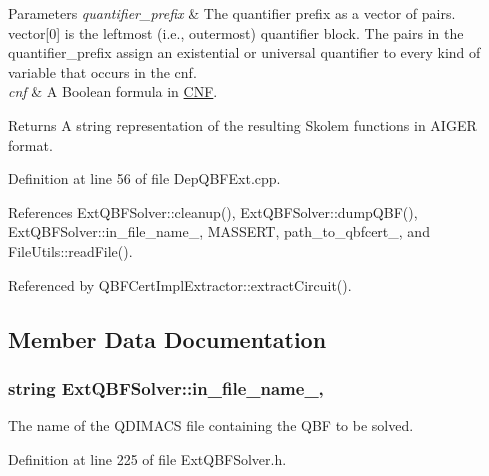 \begin{DoxyParams}{Parameters}
{\em quantifier\-\_\-prefix} & The quantifier prefix as a vector of pairs. vector\mbox{[}0\mbox{]} is the leftmost (i.\-e., outermost) quantifier block. The pairs in the quantifier\-\_\-prefix assign an existential or universal quantifier to every kind of variable that occurs in the cnf. \\
\hline
{\em cnf} & A Boolean formula in \hyperlink{classCNF}{C\-N\-F}. \\
\hline
\end{DoxyParams}
\begin{DoxyReturn}{Returns}
A string representation of the resulting Skolem functions in A\-I\-G\-E\-R format. 
\end{DoxyReturn}


Definition at line 56 of file Dep\-Q\-B\-F\-Ext.\-cpp.



References Ext\-Q\-B\-F\-Solver\-::cleanup(), Ext\-Q\-B\-F\-Solver\-::dump\-Q\-B\-F(), Ext\-Q\-B\-F\-Solver\-::in\-\_\-file\-\_\-name\-\_\-, M\-A\-S\-S\-E\-R\-T, path\-\_\-to\-\_\-qbfcert\-\_\-, and File\-Utils\-::read\-File().



Referenced by Q\-B\-F\-Cert\-Impl\-Extractor\-::extract\-Circuit().



\subsection{Member Data Documentation}
\hypertarget{classExtQBFSolver_a04d2ff483c22a11344e46d66ae7e76b1}{
\subsubsection[{in\-\_\-file\-\_\-name\-\_\-}]{\setlength{\rightskip}{0pt plus 5cm}string Ext\-Q\-B\-F\-Solver\-::in\-\_\-file\-\_\-name\-\_\-\hspace{0.3cm}{\ttfamily [protected]}, {\ttfamily [inherited]}}}\label{classExtQBFSolver_a04d2ff483c22a11344e46d66ae7e76b1}


The name of the Q\-D\-I\-M\-A\-C\-S file containing the Q\-B\-F to be solved. 



Definition at line 225 of file Ext\-Q\-B\-F\-Solver.\-h.



